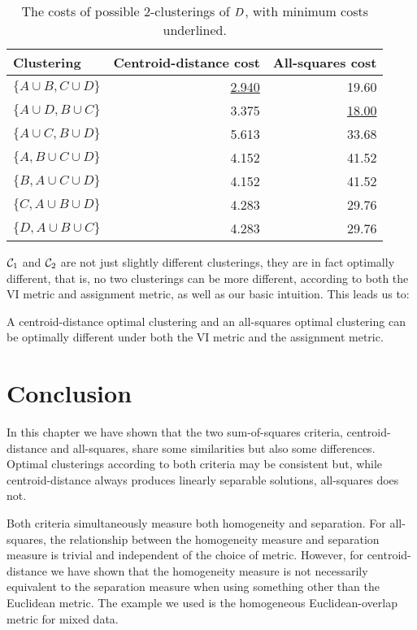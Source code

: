 \begin{table}
  \centering
  \caption{The costs of possible 2-clusterings
    of $D$, with minimum costs underlined.}
  \begin{tabular}{lrr}
  \toprule
  Clustering & Centroid-distance cost & All-squares cost \\
  \midrule
  $\{A \cup B, C \cup D\}$ & \underline{2.940} & 19.60 \\
  $\{A \cup D, B \cup C\}$ & 3.375 & \underline{18.00} \\
  $\{A \cup C, B \cup D\}$ & 5.613 & 33.68 \\
  $\{A, B \cup C \cup D\}$ & 4.152 & 41.52 \\
  $\{B, A \cup C \cup D\}$ & 4.152 & 41.52 \\
  $\{C, A \cup B \cup D\}$ & 4.283 & 29.76 \\
  $\{D, A \cup B \cup C\}$ & 4.283 & 29.76 \\
  \bottomrule
\end{tabular}
\label{tab:costs}
\end{table}


$\mathcal{C}_1$ and $\mathcal{C}_2$ are not just slightly different clusterings, they are
in fact optimally different, that is, no two clusterings can be more
different, according to both the VI metric and assignment metric, as well as
our basic intuition.  This leads us to:
\begin{thm}
  \label{thm:worst-case}
  A centroid-distance optimal clustering and an all-squares optimal clustering
  can be optimally different under both the VI metric and the assignment
  metric.
\end{thm}

\section{Conclusion}
\label{sec:conclusion}

In this chapter we have shown that the two sum-of-squares criteria,
centroid-distance and all-squares, share some similarities but also some
differences.  Optimal clusterings according to both criteria may be consistent
but, while centroid-distance always produces linearly separable solutions,
all-squares does not.

Both criteria simultaneously measure both homogeneity and separation.  For
all-squares, the relationship between the homogeneity measure and separation
measure is trivial and independent of the choice of metric.  However, for
centroid-distance we have shown that the homogeneity measure is not
necessarily equivalent to the separation measure when using something other
than the Euclidean metric.  The example we used is the homogeneous
Euclidean-overlap metric for mixed data.

